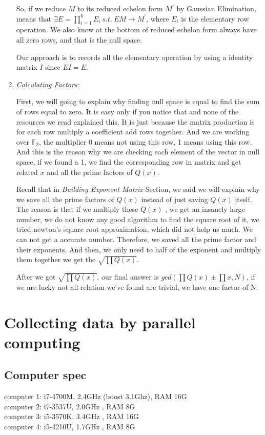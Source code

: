 \documentclass[12pt]{article} %
\newcommand{\itemgap}[1][2]{\vspace{#1mm}}
\begin{document}
\begin{enumerate}
		So, if we reduce $M$ to its reduced echelon form $M^\prime$ by Gaussian Elimination, means that $\exists E=\prod_{i=1}^k{E_i}\ s.t.\ EM \rightarrow M^\prime$, where $E_i$ is the elementary row operation. We also know at the bottom of reduced echelon form always have all zero rows, and that is the null space. 
		
		Our approach is to records all the elementary operation by using a identity matrix $I$ since $EI=E$.
		
		\item \textit{Calculating Factors:} \itemgap
		
		First, we will going to explain why finding null space is equal to find the sum of rows equal to zero. It is easy only if you notice that and none of the resources we read explained this. It is just because the matrix production is for each row multiply a coefficient add rows together. And we are working over $\mathbb{F}_2$, the multiplier 0 means not using this row, 1 means using this row. And this is the reason why we are checking each element of the vector in null space, if we found a 1, we find the corresponding row in matrix and get related $x$ and all the prime factors of $Q(x)$. 
		
		Recall that in \textit{Building Exponent Matrix} Section, we said we will explain why we save all the prime factors of $Q(x)$ instead of just saving $Q(x)$ itself. The reason is that if we multiply these $Q(x)$ , we get an insanely large number, we do not know any good algorithm to find the square root of it, we tried newton's square root approximation, which did not help us much. We can not get a accurate number. Therefore, we saved all the prime factor and their exponents. And then, we only need to half of the exponent and multiply them together we get the $\sqrt{\prod Q(x)}$. 
		
		After we got $\sqrt{\prod Q(x)}$, our final answer is $gcd\left(\prod Q(x) \pm \prod x, N\right)$, if we are lucky not all relation we've found are trivial, we have one factor of N.
		
	\end{enumerate}
	
	\section {Collecting data by parallel computing} 
	\subsection{Computer spec}
	computer 1: i7-4700M, 2.4GHz (boost 3.1Ghz), RAM 16G\\
	\indent computer 2: i7-3537U, 2.0GHz               , RAM 8G\\
	\indent computer 3: i5-3570K, 3.4GHz               , RAM 16G\\
	\indent computer 4: i5-4210U, 1.7GHz               , RAM 8G
	
\end{document}
